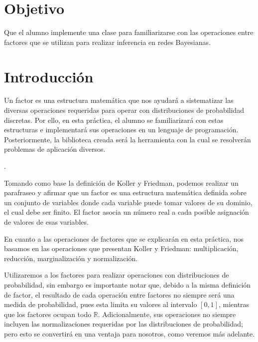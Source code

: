 \section{Objetivo}

Que el alumno implemente una clase  para familiarizarse con las operaciones entre factores que se utilizan para realizar inferencia en redes Bayesianas.

\section{Introducción}

Un factor es una estructura matemática que nos ayudará a sistematizar las diversas operaciones requeridas para operar con distribuciones de probabilidad discretas.  Por ello, en esta práctica, el alumno se familiarizará con estas estructuras e implementará sus operaciones en un lenguaje de programación.  Posteriormente, la biblioteca creada será la herramienta con la cual se resolverán problemas de aplicación diversos.

\begin{definition}[Factor]
 
 \parencite[104]{KollerFriedman2009}.
\end{definition}

Tomando como base la definición de Koller y Friedman, podemos realizar un parafraseo y afirmar que un factor es una estructura matemática definida sobre un conjunto de variables donde cada variable puede tomar valores de su dominio, el cual debe ser finito. El factor asocia un número real a cada posible asignación de valores de esas variables.

En cuanto a las operaciones de factores que se explicarán en esta práctica, nos basamos en las operaciones que presentan Koller y Friedman: multiplicación, reducción, marginalización y normalización.

Utilizaremos a los factores para realizar operaciones con distribuciones de probabilidad, sin embargo es importante notar que, debido a la misma definición de factor, el resultado de cada operación entre factores no siempre será una medida de probabilidad, pues esta limita su valores al intervalo $[0,1]$, mientras que los factores ocupan todo \(\mathbb{R}\).  Adicionalmente, sus operaciones no siempre incluyen las normalizaciones requeridas por las distribuciones de probabilidad; pero esto se convertirá en una ventaja para nosotros, como veremos más adelante.

